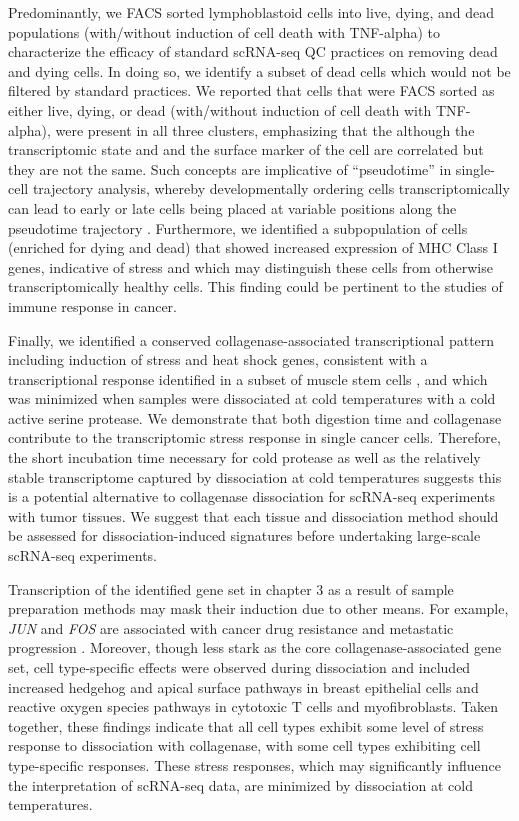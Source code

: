 Predominantly, we FACS sorted lymphoblastoid cells into live, dying, and dead populations (with/without induction of cell death with TNF-alpha) to characterize the efficacy of standard scRNA-seq QC practices on removing dead and dying cells. In doing so, we identify a subset of dead cells which would not be filtered by standard practices. We reported that cells that were FACS sorted as either live, dying, or dead (with/without induction of cell death with TNF-alpha), were present in all three clusters, emphasizing that the although the transcriptomic state and and the surface marker of the cell are correlated but they are not the same. Such concepts are implicative  of ``pseudotime'' in single-cell trajectory analysis, whereby developmentally ordering cells transcriptomically can lead to early or late cells being placed at variable positions along the pseudotime trajectory \cite{campbell2018descriptive, campbell2018uncovering}. 
 Furthermore, we identified a subpopulation of cells (enriched for dying and dead) that showed increased expression of MHC Class I genes, indicative of stress and which may distinguish these cells from otherwise transcriptomically healthy cells. This finding could be pertinent to the studies of immune response in cancer.
 

 Finally, we identified a conserved collagenase-associated transcriptional pattern including induction of stress and heat shock genes, consistent with a transcriptional response identified in a subset of muscle stem cells \cite{van2017single}, and which was minimized when samples were dissociated at cold temperatures with a cold active serine protease. We demonstrate that both digestion time and collagenase contribute to the transcriptomic stress response in single cancer cells. Therefore, the short incubation time necessary for cold protease as well as the relatively stable transcriptome captured by dissociation at cold temperatures suggests this is a potential alternative to collagenase dissociation for scRNA-seq experiments with tumor tissues. We suggest that each tissue and dissociation method should be assessed for dissociation-induced signatures before undertaking large-scale scRNA-seq experiments. 
 
 Transcription of the identified gene set in chapter 3 as a result of sample preparation methods may mask their induction due to other means. For example, \textit{JUN} and \textit{FOS} are associated with cancer drug resistance and metastatic progression \cite{insua2018stress,fan2017ap, ramsdale2015transcription}. Moreover, though less stark as the core collagenase-associated gene set, cell type-specific effects were observed during dissociation and included increased hedgehog and apical surface pathways in breast epithelial cells and reactive oxygen species pathways in cytotoxic T cells and myofibroblasts. Taken together, these findings indicate that all cell types exhibit some level of stress response to dissociation with collagenase, with some cell types exhibiting cell type-specific responses. These stress responses, which may significantly influence the interpretation of scRNA-seq data, are minimized by dissociation at cold temperatures.
 

